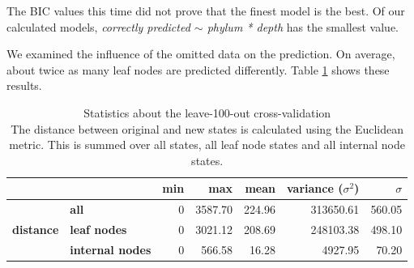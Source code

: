       The BIC values this time did not prove that the finest model is the best. Of our calculated models, 
       \textit{correctly predicted $\sim$ phylum * depth} has the smallest value.

      We examined the influence of the omitted data on the prediction. On average, about twice as many 
        leaf nodes are predicted differently. %
        Table \ref{table:statistics cross-validation} shows these results. \\
      \begin{table}[h!]
        \begin{center}
          \begin{tabular}{ |cl||r|r|r|r|r| }
            \hline
            & & \bfseries min & \bfseries max & \bfseries mean & \bfseries variance ($\sigma^2$) & $\sigma$ \\
            \hline \hline
            \multirow{3}{*}{\bfseries distance} & \bfseries all     & 0 & 3587.70 & 224.96 & 313650.61 & 560.05 \\
            & \bfseries leaf nodes                                  & 0 & 3021.12 & 208.69 & 248103.38 & 498.10 \\
            & \bfseries internal nodes                              & 0 & 566.58 & 16.28 & 4927.95 & 70.20 \\ \hline
          \end{tabular}
        \end{center}
        \caption{Statistics about the leave-100-out cross-validation \\
          The distance between original and new states is calculated using the Euclidean metric. This 
            is summed over all states, all leaf node states and all internal node states.}
        \label{table:statistics cross-validation}
      \end{table}

